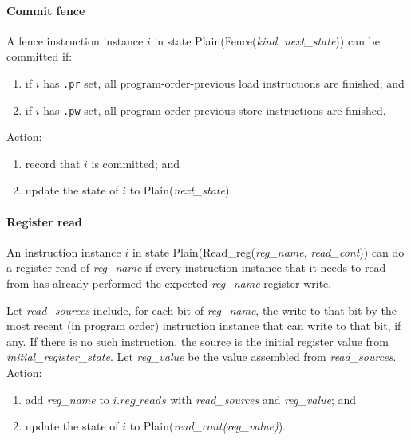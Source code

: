 \paragraph{Commit fence}\label{omm:commit_fence}
A fence instruction instance $i$ in state {\sc Plain}({\sc Fence}({\it kind}, {\it next\_state})) can be committed if:
\begin{enumerate}
\item if $i$ has {\tt .pr} set, all program-order-previous load instructions are finished; and
\item if $i$ has {\tt .pw} set, all program-order-previous store instructions are finished.
\end{enumerate}
Action:
\begin{enumerate}
\item record that $i$ is committed; and
\item update the state of $i$ to {\sc Plain}({\it next\_state}).
\end{enumerate}


\paragraph{Register read}\label{omm:reg_read}
An instruction instance $i$ in state {\sc Plain}({\sc Read\_reg}({\it reg\_name}, {\it read\_cont})) can do a register read of {\it reg\_name} if every instruction instance that it needs to read from has already performed the expected {\it reg\_name} register write.

Let {\it read\_sources} include, for each bit of {\it reg\_name}, the write to
that bit by the most recent (in program order) instruction instance that can write to that bit, if any. If there is no such instruction, the source is the initial register value from {\it initial\_register\_state}.
Let  {\it reg\_value} be the value assembled from {\it read\_sources}.
Action:
\begin{enumerate}
\item add {\it reg\_name} to $i.\textit{reg\_reads}$ with {\it read\_sources} and {\it reg\_value}; and
\item update the state of $i$ to {\sc Plain}({\it read\_cont(reg\_value)}).
\end{enumerate}


